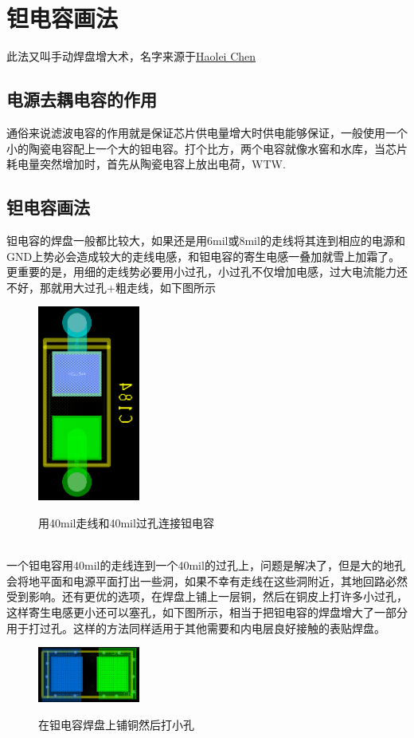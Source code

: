 \documentclass[a4paper,twoside]{article}
\begin{document}
\section{钽电容画法}
此法又叫手动焊盘增大术，名字来源于\href{mailto:chl1111@mail.ustc.edu.cn}{Haolei Chen}
\subsection{电源去耦电容的作用}
通俗来说滤波电容的作用就是保证芯片供电量增大时供电能够保证，一般使用一个小的陶瓷电容配上一个大的钽电容。打个比方，两个电容就像水窖和水库，当芯片耗电量突然增加时，首先从陶瓷电容上放出电荷，WTW.
\subsection{钽电容画法}
钽电容的焊盘一般都比较大，如果还是用6mil或8mil的走线将其连到相应的电源和GND上势必会造成较大的走线电感，和钽电容的寄生电感一叠加就雪上加霜了。更重要的是，用细的走线势必要用小过孔，小过孔不仅增加电感，过大电流能力还不好，那就用大过孔+粗走线，如下图所示
\begin{figure}[htb]
	\centering
	\includegraphics[width=0.3\textwidth]{figures/CapacitorWith40milVia.png}
	\label{Fig:CapacitorWith40milVia}
	\caption{用40mil走线和40mil过孔连接钽电容}
\end{figure}
\\一个钽电容用40mil的走线连到一个40mil的过孔上，问题是解决了，但是大的地孔会将地平面和电源平面打出一些洞，如果不幸有走线在这些洞附近，其地回路必然受到影响。还有更优的选项，在焊盘上铺上一层铜，然后在铜皮上打许多小过孔，这样寄生电感更小还可以塞孔，如下图所示，相当于把钽电容的焊盘增大了一部分用于打过孔。这样的方法同样适用于其他需要和内电层良好接触的表贴焊盘。
\begin{figure}[htb]
	\centering
	\includegraphics[width=0.3\textwidth]{figures/CapacitorWithShape.png}
	\label{fig:CapacitorWithShape}
	\caption{在钽电容焊盘上铺铜然后打小孔}
\end{figure}
\end{document}

